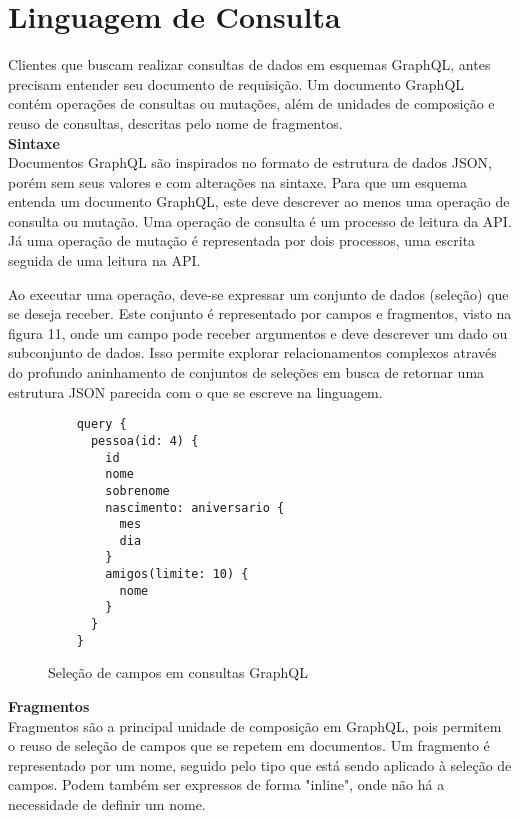 \section[Linguagem de Consulta]{Linguagem de Consulta}

Clientes que buscam realizar consultas de dados em esquemas GraphQL, antes precisam entender seu documento de requisição. Um documento GraphQL contém operações de consultas ou mutações, além de unidades de composição e reuso de consultas, descritas pelo nome de fragmentos. \cite{Facebook2016} \\

\textbf{Sintaxe} \\

Documentos GraphQL são inspirados no formato de estrutura de dados JSON, porém sem seus valores e com alterações na sintaxe. Para que um esquema entenda um documento GraphQL, este deve descrever ao menos uma operação de consulta ou mutação. Uma operação de consulta é um processo de leitura da API. Já uma operação de mutação é representada por dois processos, uma escrita seguida de uma leitura na API.

Ao executar uma operação, deve-se expressar um conjunto de dados (seleção) que se deseja receber. Este conjunto é representado por campos e fragmentos, visto na figura 11, onde um campo pode receber argumentos e deve descrever um dado ou subconjunto de dados. Isso permite explorar relacionamentos complexos através do profundo aninhamento de conjuntos de seleções em busca de retornar uma estrutura JSON parecida com o que se escreve na linguagem.

\begin{figure}[H]
  \centering
  \begin{verbatim}
    query {
      pessoa(id: 4) {
        id
        nome
        sobrenome
        nascimento: aniversario {
          mes
          dia
        }
        amigos(limite: 10) {
          nome
        }
      }
    }
  \end{verbatim}
  \caption{Seleção de campos em consultas GraphQL}
\end{figure}

\textbf{Fragmentos} \\

Fragmentos são a principal unidade de composição em GraphQL, pois permitem o reuso de seleção de campos que se repetem em documentos. Um fragmento é representado por um nome, seguido pelo tipo que está sendo aplicado à seleção de campos. Podem também ser expressos de forma "inline", onde não há a necessidade de definir um nome.

